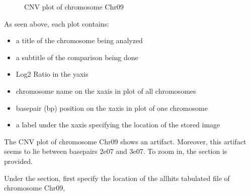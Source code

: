 \documentclass[letterpaper,10pt,english]{sphinxhowto}
\begin{document}
\begin{figure}[htbp]
\centering
\capstart

\noindent{}
\caption{CNV plot of chromosome Chr09}\label{\detokenize{index:id6}}\end{figure}

\sphinxAtStartPar
As seen above, each plot contains:
\begin{itemize}
\item {} 
\sphinxAtStartPar
a title of the chromosome being analyzed

\item {} 
\sphinxAtStartPar
a sub\sphinxhyphen{}title of the comparison being done

\item {} 
\sphinxAtStartPar
Log2 Ratio in the y\sphinxhyphen{}axis

\item {} 
\sphinxAtStartPar
chromosome name on the x\sphinxhyphen{}axis in plot of all chromosomes

\item {} 
\sphinxAtStartPar
base\sphinxhyphen{}pair (bp) position on the x\sphinxhyphen{}axis in plot of one chromosome

\item {} 
\sphinxAtStartPar
a label under the x\sphinxhyphen{}axis specifying the location of the stored image

\end{itemize}

\sphinxAtStartPar
The CNV plot of chromosome Chr09 shows an artifact. Moreover, this artifact seems to lie between base\sphinxhyphen{}pairs 2e07 and 3e07. To zoom in, the  section is provided.

\sphinxAtStartPar
Under the  section, first specify the location of the all\sphinxhyphen{}hits tabulated file of chromosome Chr09,

\begin{sphinxVerbatim}[commandchars=\\\{\}]
 \PYG{p}{[} \PYG{p}{]}   
\end{sphinxVerbatim}
\end{document}
